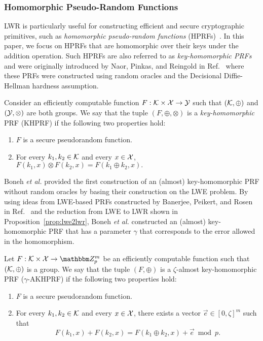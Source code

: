 \subsubsection{Homomorphic Pseudo-Random Functions}
LWR is particularly useful for constructing efficient and secure cryptographic primitives, such as \emph{homomorphic pseudo-random functions} (HPRFs)~\cite{boneh2013key}.
In this paper, we focus on HPRFs that are homomorphic over their keys under the addition operation.
Such HPRFs are also referred to as \emph{key-homomorphic PRFs} and were originally introduced by Naor, Pinkas, and Reingold in Ref.~\cite{naor1999distributed} where these PRFs were constructed using random oracles and the Decisional Diffie-Hellman hardness assumption.
\newpage
\begin{definition}
	Consider an efficiently computable function $F: \mathcal{K} \times \mathcal{X} \to \mathcal{Y}$ such that $(\mathcal{K}, \oplus)$ and $(\mathcal{Y}, \otimes)$ are both groups.
	We say that the tuple $(F, \oplus, \otimes)$ is a \emph{key-homomorphic} PRF (KHPRF) if the following two properties hold:
	\begin{enumerate}
		\item $F$ is a secure pseudorandom function.
		\item For every $k_1, k_2 \in \mathcal{K}$ and every $x \in \mathcal{X}$, $F\left(k_1, x\right) \otimes F\left(k_2, x\right) = F\left(k_1 \oplus k_2, x\right).$
	\end{enumerate}
	\end{definition}

Boneh \emph{et al.} provided the first construction of an (almost) key-homomorphic PRF without random oracles by basing their construction on the LWE problem.
By using ideas from LWE-based PRFs constructed by Banerjee, Peikert, and Rosen in Ref.~\cite{banerjee2012pseudorandom} and the reduction from LWE to LWR shown in Proposition~\ref{prop:lwe2lwr}, Boneh \emph{et al.} constructed an (almost) key-homomorphic PRF that has a parameter $\gamma$ that corresponds to the error allowed in the homomorphism.

\begin{definition}\label{def:akhprf}
	Let $F:\calK \times \calX \to \Z_p^m$ be an efficiently computable function such that $(\mathcal{K}, \oplus)$ is a group.
	We say that the tuple $(F, \oplus)$ is a $\zeta$-almost key-homomorphic PRF ($\gamma$-AKHPRF) if the following two properties hold:
	\begin{enumerate}
		\item $F$ is a secure pseudorandom function.
		\item For every $k_1, k_2 \in \mathcal{K}$ and every $x \in \mathcal{X}$, there exists a vector $\vec{e} \in [0, \zeta]^{m}$ such that 
		\[F\left(k_1, x\right) + F\left(k_2, x\right) = F\left(k_1 \oplus k_2, x\right) + \vec{e} \bmod p.\]
	\end{enumerate}
\end{definition}

